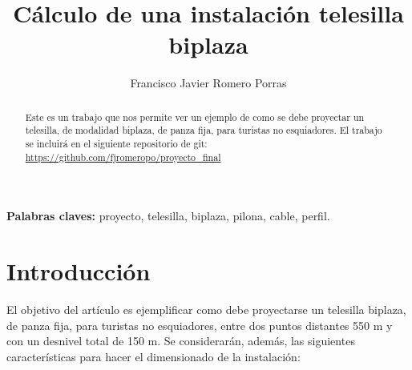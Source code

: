 \documentclass[a4paper,11pt]{article}
\begin{document}
\allsectionsfont{\normalsize}
\title{Cálculo de una instalación telesilla biplaza}
\author{Francisco Javier Romero Porras}
\maketitle
\begin{abstract}
Este es un trabajo que nos permite ver un ejemplo de como se debe proyectar un telesilla, de modalidad biplaza, de panza fija, para turistas no esquiadores. El trabajo se incluirá en el siguiente repositorio de git:\\
\url{https://github.com/fjromeropo/proyecto_final}
\end{abstract}
\textbf{Palabras claves:} proyecto, telesilla, biplaza, pilona, cable, perfil.
\tableofcontents
\part{Introducción}
El objetivo del artículo es ejemplificar como debe proyectarse un telesilla biplaza, de panza fija, para turistas no esquiadores, entre dos puntos distantes 550 m y con un desnivel total de 150 m. Se considerarán, además, las siguientes características para hacer el dimensionado de la instalación:\\
\end{document}
